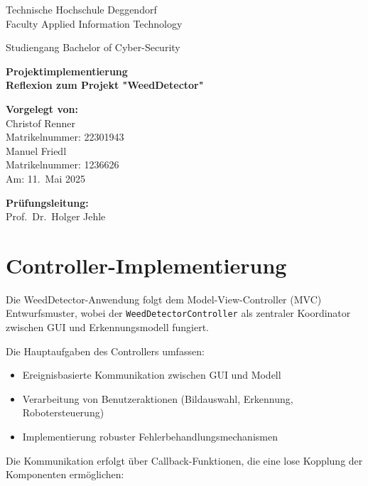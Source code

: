 \documentclass[12pt]{scrreprt}
\newcommand{\faculty}{Faculty Applied Information Technology}
\newcommand{\studies}{Bachelor of Cyber-Security}
\newcommand{\thesistitleDE}{Projektimplementierung \\ Reflexion zum Projekt "WeedDetector"}
\newcommand{\submissiondate}{11.\ Mai 2025}
\newcommand{\supervisor}{Prof.\ Dr.\ Holger Jehle}
\begin{document}
\begin{titlepage}
  \begin{center}
    {\Large Technische Hochschule Deggendorf\\
    \faculty\par}
    \vspace{0.2cm}
    {\Large Studiengang \studies\\}
    \vspace{2\baselineskip}
    {\Huge\bfseries \thesistitleDE\par}
    \vspace{3\baselineskip}
  \end{center}

  \vfill

  \parbox[t]{0.4\textwidth}{
    \textbf{Vorgelegt von:}\\[0.5em]
    Christof Renner\\
    Matrikelnummer: 22301943\\
    Manuel Friedl\\
    Matrikelnummer: 1236626\\[1em]
    Am: \submissiondate\par
  }
  \hfill
  \parbox[t]{0.4\textwidth}{
    \textbf{Prüfungsleitung:}\\[0.5em]
    \supervisor
  }
\end{titlepage}

\tableofcontents

\chapter{Controller-Implementierung}

Die WeedDetector-Anwendung folgt dem Model-View-Controller (MVC) Entwurfsmuster, wobei der \texttt{WeedDetectorController} als zentraler Koordinator zwischen GUI und Erkennungsmodell fungiert.

Die Hauptaufgaben des Controllers umfassen:
\begin{itemize}
    \item Ereignisbasierte Kommunikation zwischen GUI und Modell
    \item Verarbeitung von Benutzeraktionen (Bildauswahl, Erkennung, Robotersteuerung)
    \item Implementierung robuster Fehlerbehandlungsmechanismen
\end{itemize}

Die Kommunikation erfolgt über Callback-Funktionen, die eine lose Kopplung der Komponenten ermöglichen:
\end{document}
